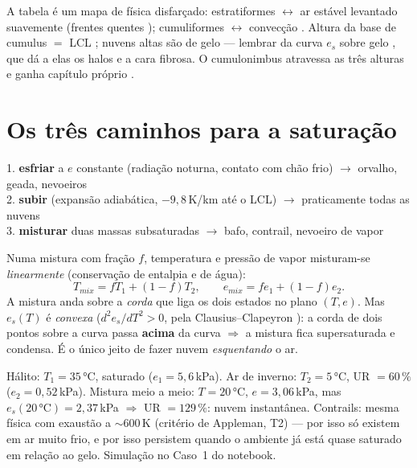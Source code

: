 \documentclass[11pt]{article}
\begin{document}
A tabela é um mapa de física disfarçado: estratiformes
$\leftrightarrow$ ar estável levantado suavemente (frentes quentes
); cumuliformes $\leftrightarrow$ convecção
. Altura da base de cumulus $=$ LCL
; nuvens altas são de gelo — lembrar da curva $e_s$
sobre gelo , que dá a elas os halos e a cara
fibrosa. O cumulonimbus atravessa as três alturas e ganha capítulo
próprio .

\section{Os três caminhos para a saturação}\label{sec:saturar}


\begin{noquadro}
1. \textbf{esfriar} a $e$ constante (radiação noturna, contato com chão
frio) $\to$ orvalho, geada, nevoeiros\\
2. \textbf{subir} (expansão adiabática, $-9{,}8$\,K/km até o LCL) $\to$
praticamente todas as nuvens\\
3. \textbf{misturar} duas massas subsaturadas $\to$ bafo, contrail,
nevoeiro de vapor
\end{noquadro}

\begin{formadif}
Numa mistura com fração $f$, temperatura e pressão de vapor misturam-se
\emph{linearmente} (conservação de entalpia e de água):
\[ T_{mix} = fT_1 + (1{-}f)T_2,\qquad e_{mix} = fe_1 + (1{-}f)e_2. \]
A mistura anda sobre a \emph{corda} que liga os dois estados no plano
$(T,e)$. Mas $e_s(T)$ é \emph{convexa} ($d^2e_s/dT^2 > 0$, pela
Clausius--Clapeyron ): a corda de dois
pontos sobre a curva passa \textbf{acima} da curva $\Rightarrow$ a
mistura fica supersaturada e condensa. É o único jeito de fazer nuvem
\emph{esquentando} o ar.
\end{formadif}

\begin{exemplo}
Hálito: $T_1 = 35\,°$C, saturado ($e_1 = 5{,}6$\,kPa). Ar de inverno:
$T_2 = 5\,°$C, UR $= 60\,\%$ ($e_2 = 0{,}52$\,kPa). Mistura meio a meio:
$T = 20\,°$C, $e = 3{,}06$\,kPa, mas $e_s(20\,°\mathrm{C}) =
2{,}37$\,kPa $\Rightarrow$ UR $= 129\,\%$: nuvem instantânea. Contrails:
mesma física com exaustão a $\sim$600\,K (critério de Appleman, T2) —
por isso só existem em ar muito frio, e por isso persistem quando o
ambiente já está quase saturado em relação ao gelo. Simulação no Caso~1
do notebook.
\end{exemplo}
\end{document}

